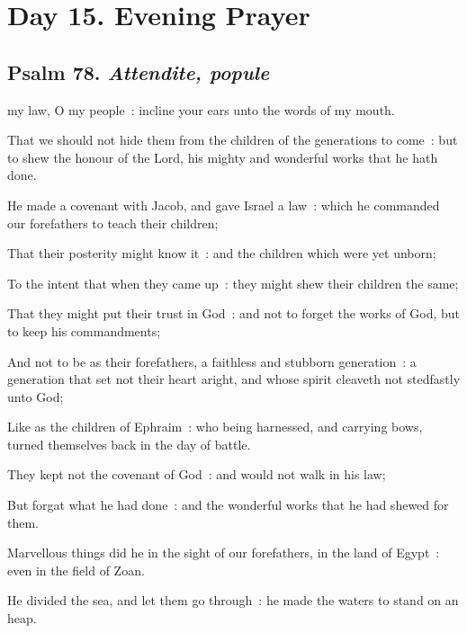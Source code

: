 \section*{Day 15. Evening Prayer}

\subsection{Psalm 78. \textit{Attendite, popule}}

 my law, O my people~: incline your ears unto the words of my mouth.\par
{}
That we should not hide them from the children of the generations to come~: but to shew the honour of the Lord, his mighty and wonderful works that he hath done.\par
{}He made a covenant with Jacob, and gave Israel a law~: which he commanded our forefathers to teach their children;\par
{}That their posterity might know it~: and the children which were yet unborn;\par
{}To the intent that when they came up~: they might shew their children the same;\par
{}That they might put their trust in God~: and not to forget the works of God, but to keep his commandments;\par
{}And not to be as their forefathers, a faithless and stubborn generation~: a generation that set not their heart aright, and whose spirit cleaveth not stedfastly unto God;\par
{}Like as the children of Ephraim~: who being harnessed, and carrying bows, turned themselves back in the day of battle.\par
{}They kept not the covenant of God~: and would not walk in his law;\par
{}But forgat what he had done~: and the wonderful works that he had shewed for them.\par
{}Marvellous things did he in the sight of our forefathers, in the land of Egypt~: even in the field of Zoan.\par
{}He divided the sea, and let them go through~: he made the waters to stand on an heap.\par
